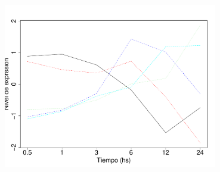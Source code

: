 \documentclass[serif,9pt, t]{beamer}
\begin{document}
\begin{frame}
\begin{columns}[T]
			\centering	
			\includegraphics[width=0.7\textwidth]{perfiles_sin_agrupar.pdf}			
	\end{columns}
\end{frame}
\end{document}
